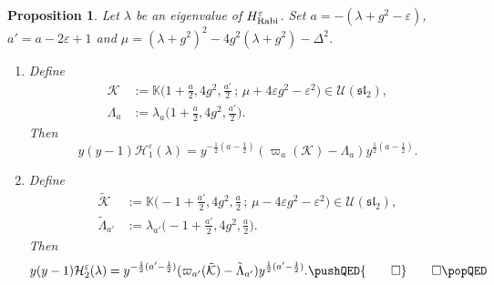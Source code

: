 \documentclass[11pt]{article}
\numberwithin{equation}{section}
\newcommand{\e}{\varepsilon}
\newcommand{\HRabi}[1]{H_{\text{\upshape Rabi}}^{#1}} %
\newcommand{\QEDhere}{\pushQED{\qed}\qedhere\popQED}
\theoremstyle{plain}
\newtheorem{prop}[thm]{Proposition}
\theoremstyle{definition}
\theoremstyle{remark}
\begin{document}
\begin{prop} \label{prop:RedEigenProblem}
  Let $\lambda$ be an eigenvalue of $\HRabi{\e}$.
  Set $a=-(\lambda+g^2-\e)$, $a'=a-2\e+1$ and \(\mu = (\lambda + g^2)^2 -4g^2 (\lambda + g^2) - \Delta^2 \).
  \begin{enumerate}[$(1)$]
  \item Define
\begin{align*}
  {\mathcal{K}} &:= \mathbb{K}\Big(1+\frac a2, 4g^2, \frac{a'}2\,;\, \mu+4\e g^2 -\e^2\Big) \in \mathcal{U}(\mathfrak{sl}_2), \\
  \Lambda_a &:= \lambda_a\Big(1 + \frac a2, 4g^2, \frac{a'}2\Big).
\end{align*}
Then
\begin{equation}
  y(y-1)\mathcal{H}_1^{\e}(\lambda)= y^{-\frac12(a-\frac12)}(\varpi_a(\mathcal{K})-\Lambda_a)y^{\frac12(a-\frac12)}.
\end{equation}
\item %
Define
\begin{align*}
  \tilde{\mathcal{K}} &:= \mathbb{K}\Big(-1+\frac{a'}2, 4g^2, \frac a2\,;\, \mu-4\e g^2 -\e^2\Big) \in \mathcal{U}(\mathfrak{sl}_2), \\
  \tilde{\Lambda}_{a'} &:= \lambda_{a'}\Big(-1+\frac{a'}2, 4g^2, \frac a2\Big).
\end{align*}
Then
\begin{equation}
  y(y-1)\mathcal{H}_2^{\e}(\lambda)= y^{-\frac12(a'-\frac12)}(\varpi_{a'}(\tilde{\mathcal{K}})-\tilde{\Lambda}_{a'})y^{\frac12(a'-\frac12)}. \QEDhere
\end{equation}
\end{enumerate}
\end{prop}
\end{document}
